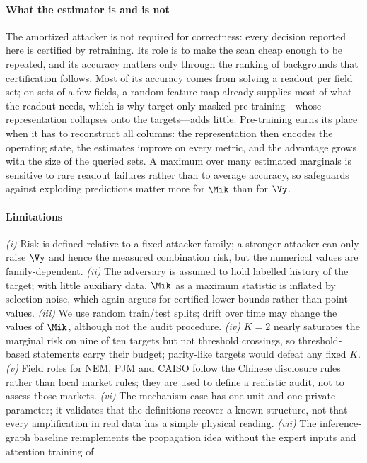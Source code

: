 \paragraph{What the estimator is and is not}
The amortized attacker is not required for correctness: every decision reported here is certified
by retraining. Its role is to make the scan cheap enough to be repeated, and its accuracy matters
only through the ranking of backgrounds that certification follows. Most of its accuracy comes from solving a readout
per field set; on sets of a few fields, a random feature map already supplies most of what the readout needs, which is
why target-only masked pre-training---whose representation collapses onto the targets---adds little. Pre-training
earns its place when it has to reconstruct all columns: the representation then encodes the operating state, the
estimates improve on every metric, and the advantage grows with the size of the queried sets. A maximum over many
estimated marginals is sensitive to rare readout failures rather than to average accuracy, so safeguards against
exploding predictions matter more for $\Mik$ than for $\Vy$.

\paragraph{Limitations}
\emph{(i)} Risk is defined relative to a fixed attacker family; a stronger attacker can only raise
$\Vy$ and hence the measured combination risk, but the numerical values are family-dependent.
\emph{(ii)} The adversary is assumed to hold labelled history of the target; with little auxiliary
data, $\Mik$ as a maximum statistic is inflated by selection noise, which again argues for certified
lower bounds rather than point values. \emph{(iii)} We use random train/test splits; drift over time
may change the values of $\Mik$, although not the audit procedure. \emph{(iv)} $K=2$ nearly saturates the marginal risk on nine of ten targets but not threshold
crossings, so threshold-based statements carry their budget; parity-like targets would defeat any fixed $K$. \emph{(v)} Field roles for NEM, PJM and CAISO follow the Chinese disclosure rules rather
than local market rules; they are used to define a realistic audit, not to assess those markets.
\emph{(vi)} The mechanism case has one unit and one private parameter; it validates that the
definitions recover a known structure, not that every amplification in real data has a simple physical
reading. \emph{(vii)} The inference-graph baseline reimplements the propagation idea without the expert inputs
and attention training of~\cite{hu2026ignn}.


